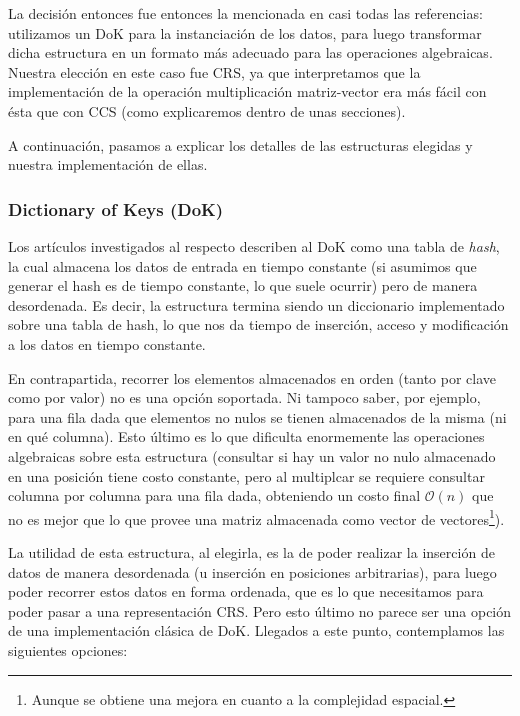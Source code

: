 \par La decisi\'on entonces fue entonces la mencionada en casi todas las
referencias: utilizamos un DoK para la instanciaci\'on de los datos, para luego
transformar dicha estructura en un formato m\'as adecuado para las operaciones
algebraicas. Nuestra elecci\'on en este caso fue CRS, ya que interpretamos que
la implementaci\'on de la operaci\'on multiplicaci\'on matriz-vector era m\'as
f\'acil con \'esta que con CCS (como explicaremos dentro de unas secciones).

\par A continuaci\'on, pasamos a explicar los detalles de las estructuras
elegidas y nuestra implementaci\'on de ellas.

\subsubsection*{Dictionary of Keys (DoK)}
\par Los art\'iculos investigados al respecto describen al DoK como una tabla de
\emph{hash}, la cual almacena los datos de entrada en tiempo constante (si
asumimos que generar el hash es de tiempo constante, lo que suele ocurrir) pero
de manera desordenada. Es decir, la estructura termina siendo un diccionario
implementado sobre una tabla de hash, lo que nos da tiempo de inserci\'on,
acceso y modificaci\'on a los datos en tiempo constante.

\par En contrapartida, recorrer los elementos almacenados en orden (tanto por
clave como por valor) no es una opci\'on soportada. Ni tampoco saber, por
ejemplo, para una fila dada que elementos no nulos se tienen almacenados de la
misma (ni en qué columna). Esto \'ultimo es lo que dificulta enormemente las
operaciones algebraicas sobre esta estructura (consultar si hay un valor no
nulo almacenado en una posici\'on tiene costo constante, pero al multiplcar se
requiere consultar columna por columna para una fila dada, obteniendo un costo
final $\mathcal{O}(n)$ que no es mejor que lo que provee una matriz almacenada
como vector de vectores\footnote{Aunque se obtiene una mejora en cuanto a la
complejidad espacial.}).

\par La utilidad de esta estructura, al elegirla, es la de poder realizar la
inserci\'on de datos de manera desordenada (u inserci\'on en posiciones
arbitrarias), para luego poder recorrer estos datos en forma ordenada, que es lo
que necesitamos para poder pasar a una representaci\'on CRS. Pero esto \'ultimo
no parece ser una opci\'on de una implementaci\'on cl\'asica de DoK. Llegados a
este punto, contemplamos las siguientes opciones:

